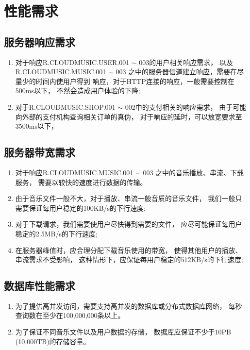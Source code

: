\section{性能需求}

\subsection{服务器响应需求}
\begin{enumerate}
	\item 对于响应R.CLOUDMUSIC.USER.001 $\sim$ 003的用户相关响应需求，
		以及R.CLOUDMUSIC.MUSIC.001 $\sim$ 003
		之中的服务器信道建立响应，需要在尽量少的时间内使用户得到
		响应，对于HTTP连接的响应，一般需要控制在500ms以下，
		不然会造成用户体验的下降;
	\item 对于R.CLOUDMUSIC.SHOP.001 $\sim$ 002中的支付相关的响应需求，
		由于可能向外部的支付机构查询相关订单的真伪，
		对于响应的延时，可以放宽要求至3500ms以下，
\end{enumerate}

\subsection{服务器带宽需求}
\begin{enumerate}
	\item 对于响应R.CLOUDMUSIC.MUSIC.001 $\sim$ 003
		之中的音乐播放、串流、下载服务，
		需要以较快的速度进行数据的传输。
	\item 由于音乐文件一般不大，对于播放、串流一般音质的音乐文件，
		我们一般只需要保证每用户稳定的100KB/s的下行速度;
	\item 对于下载请求，我们需要使用户尽快得到需要的文件，
		应尽可能保证每用户稳定的2.5MB/s的下行速度;
	\item 在服务器峰值时，应合理分配下载音乐使用的带宽，
		使得其他用户的播放、串流需求不受影响，
		这种情形下，应保证每用户稳定的512KB/s的下行速度;
\end{enumerate}

\subsection{数据库性能需求}
\begin{enumerate}
	\item 为了提供高并发访问，需要支持高并发的数据库或分布式数据库网络，
		每秒查询数在至少在100,000,000条以上。
	\item 为了保证不同音乐文件以及用户数据的存储，
		数据库应保证不少于10PB (10,000TB)的存储容量。
\end{enumerate}

